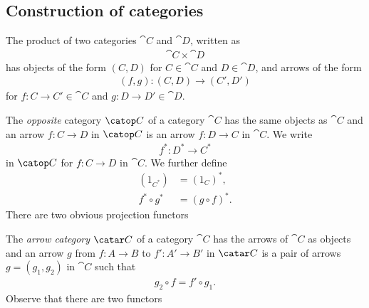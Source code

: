 \documentclass{article}
\begin{document}
\subsection{Construction of categories}

\begin{definition}
	The product of two categories $\cat{C}$ and $\cat{D}$, written
	as
	\begin{align*}
		\cat{C}\times\cat{D}
	\end{align*}
	has objects of the form $(C,D)$ for $C\in\cat{C}$ and $D\in\cat{D}$,
	and arrows of the form
	\begin{align*}
		(f,g):(C,D)\to (C',D')
	\end{align*}
	for $f:C\to C'\in\cat{C}$ and $g:D\to D'\in\cat{D}$.
\end{definition}

\begin{definition}
	The \emph{opposite} category $\catop C$ of a category $\cat C$ has
	the same objects as $\cat C$ and an arrow $f:C\to D$ in $\catop C$
	is an arrow $f:D\to C$ in $\cat C$. We write
	\begin{align*}
		f^* : D^* \to C^*
	\end{align*}
	in $\catop C$ for $f:C\to D$ in $\cat C$. We further define
	\begin{align*}
		(1_{C^*})    & = (1_C)^*,      \\
		f^*\circ g^* & = (g\circ f)^*.
	\end{align*}
	There are two obvious projection functors
	\begin{center}
	\end{center}
\end{definition}

\begin{definition}
	The \emph{arrow category} $\catar C$ of a category $\cat C$
	has the arrows of $\cat C$ as objects and an arrow $g$ from
	$f:A\to B$ to $f':A'\to B'$ in $\catar C$ is a pair of arrows
	$g=(g_1, g_2)$ in $\cat C$ such that
	\begin{align*}
		g_2\circ f = f'\circ g_1.
	\end{align*}
	Observe that there are two functors
	\begin{center}
	\end{center}
\end{definition}
\end{document}
